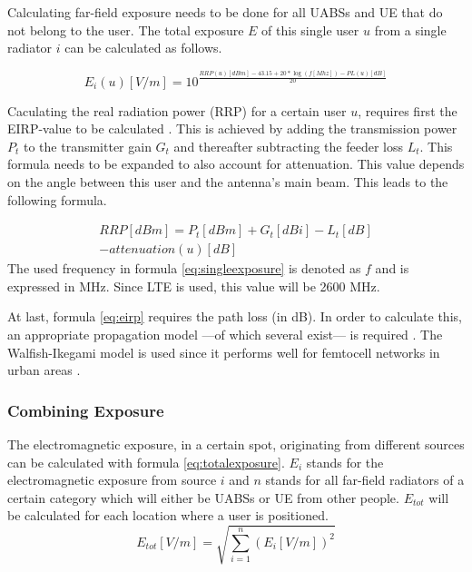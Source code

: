 \documentclass[twocolumn]{phdsymp} %
\begin{document}
Calculating far-field exposure needs to be done for all UABSs and UE that do not belong to the user.
The total exposure $E$ of this single user $u$ from a single radiator $i$ can be calculated
as follows.

\begin{equation}
E_i(u) [V/m] = 10^{\frac{RRP(u)[dBm] - 43.15 + 20*\log(f [Mhz])- PL(u) [dB]}{20}}
\label{eq:singleexposure}
\end{equation}

Caculating the real radiation power (RRP) for a certain user $u$, requires first the EIRP-value to be calculated  \cite{J6_originalExposureFormula,J1}.
This is achieved by adding the transmission power $P_t$ to the transmitter gain $G_t$ and thereafter subtracting the feeder loss $L_t$.
This formula needs to be expanded to also account for attenuation. This value depends on the angle 
between this user and the antenna's main beam. This leads to the following formula.

\begin{equation}
\begin{aligned}
RRP [dBm] = P_t [dBm] + G_t [dBi]- L_t [dB]\\
     - attenuation(u) [dB]
\end{aligned}
\label{eq:eirp}
\end{equation}
The used frequency in formula \ref{eq:singleexposure} is denoted as $f$ and is expressed in MHz. Since \gls{LTE} is used, this value will be 2600 MHz.

At last, formula \ref{eq:eirp} requires the path loss (in dB). In order to calculate this, an appropriate propagation model ---of which several exist--- is required .
The Walfish-Ikegami model is used since it performs well for femtocell networks in urban areas \cite{J2}. %

\subsubsection{Combining Exposure}
The electromagnetic exposure, in a certain spot, originating from different sources can be calculated with formula \ref{eq:totalexposure}. $E_i$ stands for 
the electromagnetic exposure from source $i$ and
$n$ stands for all far-field radiators of a certain category which will either be UABSs or UE from other people.
$E_{tot}$ will be calculated for each location where a user is positioned.  
\begin{equation}
E_{tot} [V/m] = \sqrt{\sum_{i=1}^{n} (E_i [V/m]) ^2}
\label{eq:totalexposure}
\end{equation}
\end{document}
